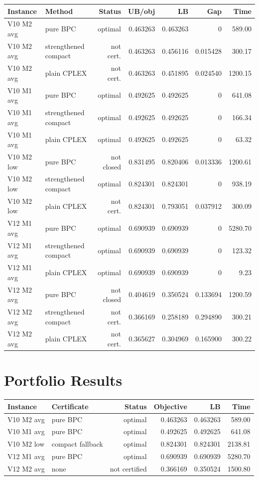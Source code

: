 \documentclass{article}
\begin{document}
\begin{longtable}{llrrrrr}
\toprule
Instance & Method & Status & UB/obj & LB & Gap & Time\\
\midrule
V10 M2 avg & pure BPC & optimal & 0.463263 & 0.463263 & 0 & 589.00\\
V10 M2 avg & strengthened compact & not cert. & 0.463263 & 0.456116 & 0.015428 & 300.17\\
V10 M2 avg & plain CPLEX & not cert. & 0.463263 & 0.451895 & 0.024540 & 1200.15\\
V10 M1 avg & pure BPC & optimal & 0.492625 & 0.492625 & 0 & 641.08\\
V10 M1 avg & strengthened compact & optimal & 0.492625 & 0.492625 & 0 & 166.34\\
V10 M1 avg & plain CPLEX & optimal & 0.492625 & 0.492625 & 0 & 63.32\\
V10 M2 low & pure BPC & not closed & 0.831495 & 0.820406 & 0.013336 & 1200.61\\
V10 M2 low & strengthened compact & optimal & 0.824301 & 0.824301 & 0 & 938.19\\
V10 M2 low & plain CPLEX & not cert. & 0.824301 & 0.793051 & 0.037912 & 300.09\\
V12 M1 avg & pure BPC & optimal & 0.690939 & 0.690939 & 0 & 5280.70\\
V12 M1 avg & strengthened compact & optimal & 0.690939 & 0.690939 & 0 & 123.32\\
V12 M1 avg & plain CPLEX & optimal & 0.690939 & 0.690939 & 0 & 9.23\\
V12 M2 avg & pure BPC & not closed & 0.404619 & 0.350524 & 0.133694 & 1200.59\\
V12 M2 avg & strengthened compact & not cert. & 0.366169 & 0.258189 & 0.294890 & 300.21\\
V12 M2 avg & plain CPLEX & not cert. & 0.365627 & 0.304969 & 0.165900 & 300.22\\
\bottomrule
\end{longtable}

\section{Portfolio Results}

\begin{longtable}{llrrrr}
\toprule
Instance & Certificate & Status & Objective & LB & Time\\
\midrule
V10 M2 avg & pure BPC & optimal & 0.463263 & 0.463263 & 589.00\\
V10 M1 avg & pure BPC & optimal & 0.492625 & 0.492625 & 641.08\\
V10 M2 low & compact fallback & optimal & 0.824301 & 0.824301 & 2138.81\\
V12 M1 avg & pure BPC & optimal & 0.690939 & 0.690939 & 5280.70\\
V12 M2 avg & none & not certified & 0.366169 & 0.350524 & 1500.80\\
\bottomrule
\end{longtable}
\end{document}

